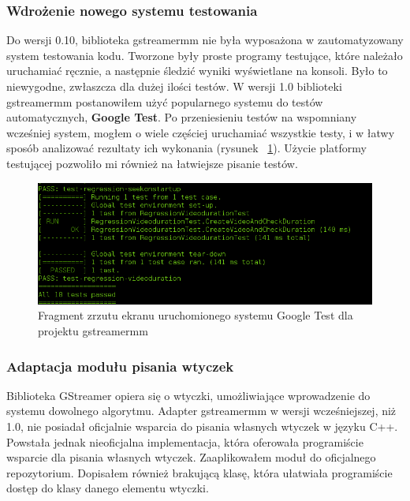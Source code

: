 \documentclass[12pt]{article}
\begin{document}
\subsubsection{Wdrożenie nowego systemu testowania}
Do wersji 0.10, biblioteka gstreamermm nie była wyposażona w zautomatyzowany system testowania kodu. Tworzone były proste programy testujące, które należało uruchamiać ręcznie, a następnie śledzić wyniki wyświetlane na konsoli. Było to niewygodne, zwłaszcza dla dużej ilości testów. W wersji 1.0 biblioteki gstreamermm postanowiłem użyć popularnego systemu do testów automatycznych, \textbf{Google Test}. Po przeniesieniu testów na wspomniany wcześniej system, mogłem o wiele częściej uruchamiać wszystkie testy, i w łatwy sposób analizować rezultaty ich wykonania (rysunek ~\ref{fig:gtestScreen}). Użycie platformy testującej pozwoliło mi również na łatwiejsze pisanie testów.
\begin{figure}[H]
  \includegraphics[width=150mm]{img/gtest-screen.png}
  \caption{Fragment zrzutu ekranu uruchomionego systemu Google Test dla projektu gstreamermm}
  \label{fig:gtestScreen}
\end{figure}
\subsubsection{Adaptacja modułu pisania wtyczek}
Biblioteka GStreamer opiera się o wtyczki, umożliwiające wprowadzenie do systemu dowolnego algorytmu. Adapter gstreamermm w wersji wcześniejszej, niż 1.0, nie posiadał oficjalnie wsparcia do pisania własnych wtyczek w języku C++. Powstała jednak nieoficjalna implementacja\cite{pepergithub}, która oferowała programiście wsparcie dla pisania własnych wtyczek. Zaaplikowałem moduł do oficjalnego repozytorium. Dopisałem również brakującą klasę, która ułatwiała programiście dostęp do klasy danego elementu wtyczki.
\end{document}
